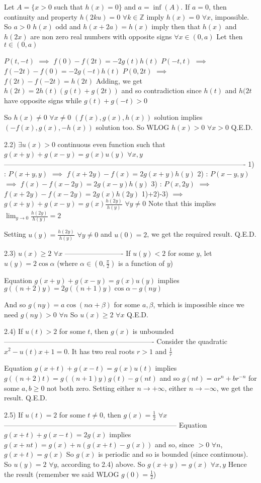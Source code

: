 \begin{solution}
Let $A=\{x>0$ such that $h(x)=0\}$ and $a=\inf(A)$.
If $a=0$, then continuity and property $h(2ku)=0$ $\forall k\in\mathbb Z$ imply $h(x)=0$ $\forall x$, impossible.
So $a>0$
$h(x)$ odd and $h(x+2a)=h(x)$ imply then that $h(x)$ and $h(2x)$ are non zero real numbers with opposite signs $\forall x\in(0,a)$
Let then $t\in(0,a)$

$P(t,-t)$ $\implies$ $f(0)-f(2t)=-2g(t)h(t)$
$P(-t,t)$ $\implies$ $f(-2t)-f(0)=-2g(-t)h(t)$
$P(0,2t)$ $\implies$ $f(2t)-f(-2t)=h(2t)$
Adding, we get $h(2t)=2h(t)(g(t)+g(2t))$ and so contradiction since $h(t)$ and $h(2t$ have opposite signs while $g(t)+g(-t)>0$

So $h(x)\ne 0$ $\forall x\ne 0$
$(f(x),g(x),h(x))$ solution implies $(-f(x),g(x),-h(x))$ solution too. So WLOG $h(x)>0$ $\forall x>0$
Q.E.D.

2.2) $\exists u(x)>0$ continuous even function such that $g(x+y)+g(x-y)=g(x)u(y)$ $\forall x,y$
-------------------------------------------------------------------------------------------------------
1) : $P(x+y,y)$ $\implies$ $f(x+2y)-f(x)=2g(x+y)h(y)$
2) : $P(x-y,y)$ $\implies$ $f(x)-f(x-2y)=2g(x-y)h(y)$
3) : $P(x,2y)$ $\implies$ $f(x+2y)-f(x-2y)=2g(x)h(2y)$
1)+2)-3) $\implies$ $g(x+y)+g(x-y)=g(x)\frac{h(2y)}{h(y)}$ $\forall y\ne 0$
Note that this implies $\lim_{y\to 0}\frac{h(2y)}{h(y)}=2$

Setting $u(y)=\frac{h(2y)}{h(y)}$ $\forall y\ne 0$ and $u(0)=2$, we get the required result.
Q.E.D.

2.3) $u(x)\ge 2$ $\forall x$
-------------------------
If $u(y)< 2$ for some $y$, let $u(y)=2\cos \alpha$ (where $\alpha\in(0,\frac{\pi}2)$ is a function of $y$)

Equation $g(x+y)+g(x-y)=g(x)u(y)$ implies $g((n+2)y)=2 g((n+1)y)\cos\alpha-g(ny)$

And so $g(ny)=a\cos(n\alpha+\beta)$ for some $a,\beta$, which is impossible since we need $g(ny)>0$ $\forall n$
So $u(x)\ge 2$ $\forall x$
Q.E.D.

2.4) If $u(t)>2$ for some $t$, then $g(x)$ is unbounded
----------------------------------------------------------------
Consider the quadratic $x^2-u(t)x+1=0$. It has two real roots $r>1$ and $\frac 1r$

Equation $g(x+t)+g(x-t)=g(x)u(t)$ implies $g((n+2)t)= g((n+1)y)g(t)-g(nt)$ and so $g(nt)=ar^n+br^{-n}$ for some $a,b\ge 0$ not both zero.
Setting either $n\to+\infty$, either $n\to -\infty$, we get the result.
Q.E.D.


2.5) If $u(t)=2$ for some $t\ne 0$, then $g(x)=\frac 12$ $\forall x$
--------------------------------------------------------------------------
Equation $g(x+t)+g(x-t)=2g(x)$ implies $g(x+nt)=g(x)+n(g(x+t)-g(x))$ and so, since $>0$ $\forall n$, $g(x+t)=g(x)$
So $g(x)$ is periodic and so is bounded (since continuous).
So $u(y)=2$ $\forall y$, according to 2.4) above.
So $g(x+y)=g(x)$ $\forall x,y$ 
Hence the result (remember we said WLOG $g(0)=\frac 12$)


\end{solution}

